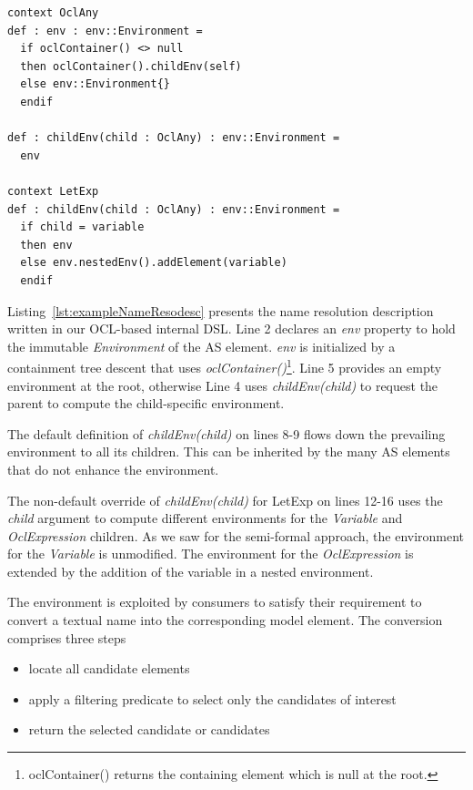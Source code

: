 \documentclass{llncs}
\begin{document}

\begin{lstlisting}[caption=Name resolution producers, label=lst:exampleNameResodesc, language=OCL]  
context OclAny
def : env : env::Environment = 
  if oclContainer() <> null
  then oclContainer().childEnv(self)
  else env::Environment{}
  endif

def : childEnv(child : OclAny) : env::Environment =
  env

context LetExp
def : childEnv(child : OclAny) : env::Environment =
  if child = variable
  then env
  else env.nestedEnv().addElement(variable)
  endif
\end{lstlisting}

Listing~\ref{lst:exampleNameResodesc} presents the name resolution description written in our OCL-based internal DSL. Line 2 declares an \emph{env} property to hold the immutable \emph{Environment} of the AS element. \emph{env} is initialized by a containment tree descent that uses \emph{oclContainer()}\footnote{oclContainer() returns the containing element which is null at the root.}. Line 5 provides an empty environment at the root, otherwise Line 4 uses \emph{childEnv(child)} to request the parent to compute the child-specific environment. 

The default definition of \emph{childEnv(child)} on lines 8-9 flows down the prevailing environment to all its children. This can be inherited by the many AS elements that do not enhance the environment.

The non-default override of \emph{childEnv(child)} for LetExp on lines 12-16 uses the \emph{child} argument to compute different environments for the \emph{Variable} and \emph{OclExpression} children. As we saw for the semi-formal approach, the environment for the \emph{Variable} is unmodified. The environment for the \emph{OclExpression} is extended by the addition of the variable in a nested environment. 

The environment is exploited by consumers to satisfy their requirement to convert a textual name into the corresponding model element. The conversion comprises three steps
\begin{itemize}
\item locate all candidate elements
\item apply a filtering predicate to select only the candidates of interest
\item return the selected candidate or candidates
\end{itemize}
\end{document}
